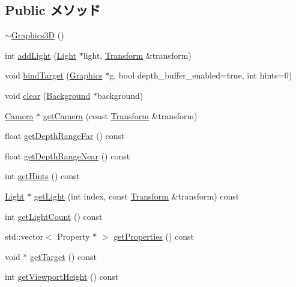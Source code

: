 \subsection*{Public メソッド}
\begin{CompactItemize}
\item 
\hyperlink{classm3g_1_1Graphics3D_9b9347476fc10e57b31694ac8a628511}{$\sim$Graphics3D} ()
\item 
int \hyperlink{classm3g_1_1Graphics3D_e210cacb72c8540df86a6674e3c2dc4f}{addLight} (\hyperlink{classm3g_1_1Light}{Light} $\ast$light, \hyperlink{classm3g_1_1Transform}{Transform} \&transform)
\item 
void \hyperlink{classm3g_1_1Graphics3D_2173e179f4b2d7130cde46a48794ee66}{bindTarget} (\hyperlink{classm3g_1_1Graphics}{Graphics} $\ast$g, bool depth\_\-buffer\_\-enabled=true, int hints=0)
\item 
void \hyperlink{classm3g_1_1Graphics3D_21c4a68a53cfbe0a7cec05d5a56682bf}{clear} (\hyperlink{classm3g_1_1Background}{Background} $\ast$background)
\item 
\hyperlink{classm3g_1_1Camera}{Camera} $\ast$ \hyperlink{classm3g_1_1Graphics3D_570b81f426d1b2b5e8794cffb33422c6}{getCamera} (const \hyperlink{classm3g_1_1Transform}{Transform} \&transform)
\item 
float \hyperlink{classm3g_1_1Graphics3D_c8c185b99073215202d2e35723f5c470}{getDepthRangeFar} () const 
\item 
float \hyperlink{classm3g_1_1Graphics3D_60bc116f673bf2782de2df3eebfb2c92}{getDepthRangeNear} () const 
\item 
int \hyperlink{classm3g_1_1Graphics3D_5837234a23dc5f46d3adec17f521b58e}{getHints} () const 
\item 
\hyperlink{classm3g_1_1Light}{Light} $\ast$ \hyperlink{classm3g_1_1Graphics3D_04272e584440c89fb4cb449003a84e7d}{getLight} (int index, const \hyperlink{classm3g_1_1Transform}{Transform} \&transform) const 
\item 
int \hyperlink{classm3g_1_1Graphics3D_7a08cfeb48d76ad5d8859a1fc0c77d98}{getLightCount} () const 
\item 
std::vector$<$ Property $\ast$ $>$ \hyperlink{classm3g_1_1Graphics3D_d87d3f8145ea47e2b736c6c3525dad5c}{getProperties} () const 
\item 
void $\ast$ \hyperlink{classm3g_1_1Graphics3D_02d0033930c8e68f4d7ebd43abe7980a}{getTarget} () const 
\item 
int \hyperlink{classm3g_1_1Graphics3D_d51e0c421126f5deb61b359cdb7dab2e}{getViewportHeight} () const 
\item 

\end{CompactItemize}
